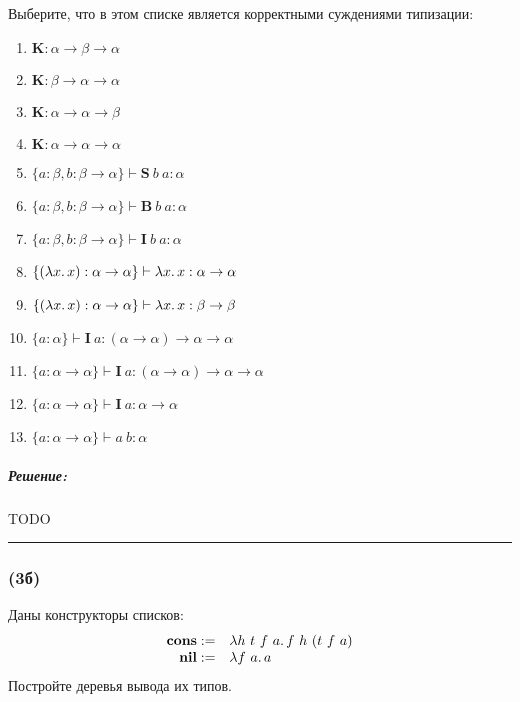 \documentclass{article}
\newenvironment{proof}{\subparagraph{\hspace{-1em}Решение:\newline}}{\par\noindent\rule{\textwidth}{0.4pt}}
\begin{document}
    Выберите, что в этом списке является корректными суждениями типизации:
    \begin{enumerate}
        \item $\mathbf{K} : \alpha \to \beta \to \alpha$
        \item $\mathbf{K} : \beta \to \alpha \to \alpha$
        \item $\mathbf{K} : \alpha \to \alpha \to \beta$
        \item $\mathbf{K} : \alpha \to \alpha \to \alpha$
        \item $\{a: \beta, b: \beta \to \alpha\} \vdash \mathbf{S}~b~a : \alpha$
        \item $\{a: \beta, b: \beta \to \alpha\} \vdash \mathbf{B}~b~a : \alpha$
        \item $\{a: \beta, b: \beta \to \alpha\} \vdash \mathbf{I}~b~a : \alpha$
        \item $\{(\lambda x\ldotp x): \alpha \to \alpha\}\vdash \lambda x \ldotp x: \alpha \to \alpha$
        \item $\{(\lambda x\ldotp x): \alpha \to \alpha\}\vdash \lambda x \ldotp x: \beta \to \beta$
        \item $\{a: \alpha\} \vdash \mathbf{I}~a : (\alpha \to \alpha) \to \alpha \to \alpha$
        \item $\{a: \alpha \to \alpha\} \vdash \mathbf{I}~a : (\alpha \to \alpha) \to \alpha \to \alpha$
        \item $\{a: \alpha \to \alpha\} \vdash \mathbf{I}~a : \alpha \to \alpha$
        \item $\{a: \alpha \to \alpha\} \vdash a~b : \alpha$
    \end{enumerate}

    \begin{proof}
        TODO %
    \end{proof}

    \subsubsection{(3б)}
    
    Даны конструкторы списков:
    $$\begin{array}{rl}
        \mathbf{cons} :=& \lambda h~t~f~a\ldotp f~h~(t~f~a) \\
        \mathbf{nil} :=& \lambda f~a\ldotp a
    \end{array}$$
    Постройте деревья вывода их типов.
    
\end{document}
